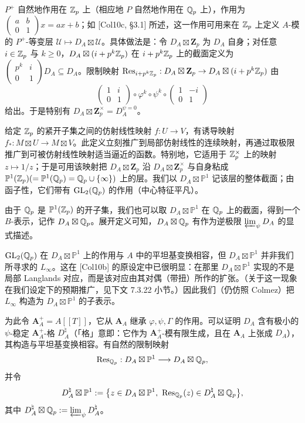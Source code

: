 $P^+$ 自然地作用在 $\mathbb{Z}_p$ 上（相应地 $P$ 自然地作用在 $\mathbb{Q}_p$ 上），作用为 $\begin{pmatrix}a&b\\0&1\end{pmatrix}x=ax+b$；如 [Col10c, §3.1] 所述，这一作用可用来在 $\mathbb{Z}_p$ 上定义 $A$-模的 $P^+$-等变层 $\mathcal U\mapsto D_A\boxtimes\mathcal U$。具体做法是：令 $D_A\boxtimes\mathbf Z_p$ 为 $D_A$ 自身；对任意 $i\in\mathbb{Z}_p$ 与 $k\ge0$，$D_A\boxtimes(i+p^k\mathbb{Z}_p)$ 在 $i+p^k\mathbb{Z}_p$ 上的截面定义为 $\begin{pmatrix}p^k&i\\0&1\end{pmatrix}D_A\subseteq D_A$。限制映射 $\operatorname{Res}_{i+p^k\mathbb{Z}_p}:D_A\boxtimes\mathbf Z_p\to D_A\boxtimes(i+p^k\mathbb{Z}_p)$ 由
\[
\begin{pmatrix}1&i\\0&1\end{pmatrix}\circ\varphi^k\circ\psi^k\circ\begin{pmatrix}1&-i\\0&1\end{pmatrix}
\]
给出。于是特别有 $D_A\boxtimes\mathbf Z_p^\times=D_A^{\psi=0}$。

给定 $\mathbb{Z}_p$ 的紧开子集之间的仿射线性映射 $f:U\to V$，有诱导映射 $f_*:M\boxtimes U\to M\boxtimes V$。此定义立刻推广到局部仿射线性的连续映射，再通过取极限推广到可被仿射线性映射适当逼近的函数。特别地，它适用于 $\mathbb{Z}_p^\times$ 上的映射 $z\mapsto1/z$；于是可用该映射把 $D_A\boxtimes\mathbf Z_p$ 沿 $D_A\boxtimes\mathbf Z_p^\times$ 与自身粘成 $\mathbb P^1(\mathbb{Z}_p)(=\mathbb P^1(\mathbb{Q}_p)=\mathbb{Q}_p\cup\{\infty\})$ 上的层。我们以 $D_A\boxtimes\mathbb P^1$ 记该层的整体截面；由函子性，它们带有 $\mathrm{GL}_2(\mathbb{Q}_p)$ 的作用（中心特征平凡）。

由于 $\mathbb{Q}_p$ 是 $\mathbb P^1(\mathbb{Z}_p)$ 的开子集，我们也可以取 $D_A\boxtimes\mathbb P^1$ 在 $\mathbb{Q}_p$ 上的截面，得到一个 $B$-表示，记作 $D_A\boxtimes\mathbb{Q}_p$。展开定义可知，$D_A\boxtimes\mathbb{Q}_p$ 有作为逆极限 $\varprojlim_\psi D_A$ 的显式描述。

$\mathrm{GL}_2(\mathbb{Q}_p)$ 在 $D_A\boxtimes\mathbb P^1$ 上的作用与 $A$ 中的平坦基变换相容，但 $D_A\boxtimes\mathbb P^1$ 并非我们所寻求的 $L_\infty$。这在 [Col10b] 的原设定中已很明显：在那里 $D_A\boxtimes\mathbb P^1$ 实现的不是局部 Langlands 对应，而是该对应由其对偶（带扭）所作的扩张。（关于这一现象在我们设定下的预期推广，见下文 7.3.22 小节。）因此我们（仍仿照 Colmez）把 $L_\infty$ 构造为 $D_A\boxtimes\mathbb P^1$ 的子表示。

为此令 $\mathbf A_A^+=A[[T]]$，它从 $\mathbf A_A$ 继承 $\varphi,\psi,\Gamma$ 的作用。可以证明 $D_A$ 含有极小的 $\psi$-稳定 $\mathbf A_A^+$-格 $D_A^\natural$（「格」意即：它作为 $\mathbf A_A^+$-模有限生成，且在 $\mathbf A_A$ 上张成 $D_A$），其构造与平坦基变换相容。有自然的限制映射
\[
\operatorname{Res}_{\mathbb{Q}_p}:D_A\boxtimes\mathbb P^1\longrightarrow D_A\boxtimes\mathbb{Q}_p,
\]
并令
\[
D_A^\natural\boxtimes\mathbb P^1
:=\bigl\{z\in D_A\boxtimes\mathbb P^1,\ \operatorname{Res}_{\mathbb{Q}_p}(z)\in D_A^\natural\boxtimes\mathbb{Q}_p\bigr\},
\]
其中 $D_A^\natural\boxtimes\mathbb{Q}_p:=\varprojlim_\psi D_A^\natural$。

